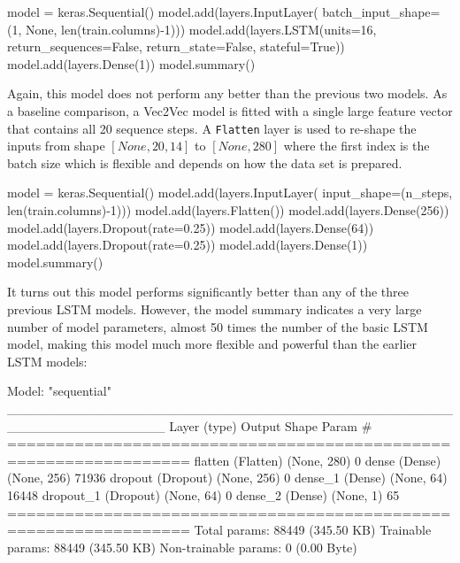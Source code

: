 \begin{samepage}
\begin{pythoncode}
model = keras.Sequential()
model.add(layers.InputLayer(
    batch_input_shape=(1, None, len(train.columns)-1)))
model.add(layers.LSTM(units=16,
    return_sequences=False, return_state=False, stateful=True))
model.add(layers.Dense(1))
model.summary()
\end{pythoncode}
\end{samepage}

Again, this model does not perform any better than the previous two models. As a baseline comparison, a Vec2Vec model is fitted with a single large feature vector that contains all 20 sequence steps. A \texttt{Flatten} layer is used to re-shape the inputs from shape $[None, 20, 14]$ to $[None, 280]$ where the first index is the batch size which is flexible and depends on how the data set is prepared.

\begin{samepage}
\begin{pythoncode}
model = keras.Sequential()
model.add(layers.InputLayer(
    input_shape=(n_steps, len(train.columns)-1)))
model.add(layers.Flatten())
model.add(layers.Dense(256))
model.add(layers.Dropout(rate=0.25))
model.add(layers.Dense(64))
model.add(layers.Dropout(rate=0.25))
model.add(layers.Dense(1))
model.summary()
\end{pythoncode}
\end{samepage}

It turns out this model performs significantly better than any of the three previous LSTM models. However, the model summary indicates a very large number of model parameters, almost 50 times the number of the basic LSTM model, making this model much more flexible and powerful than the earlier LSTM models:

\begin{samepage}
\begin{textcode}
Model: "sequential"
_________________________________________________________________
 Layer (type)                Output Shape              Param #   
=================================================================
 flatten (Flatten)           (None, 280)               0         
 dense (Dense)               (None, 256)               71936     
 dropout (Dropout)           (None, 256)               0         
 dense_1 (Dense)             (None, 64)                16448     
 dropout_1 (Dropout)         (None, 64)                0         
 dense_2 (Dense)             (None, 1)                 65        
=================================================================
Total params: 88449 (345.50 KB)
Trainable params: 88449 (345.50 KB)
Non-trainable params: 0 (0.00 Byte)
\end{textcode}
\end{samepage}

